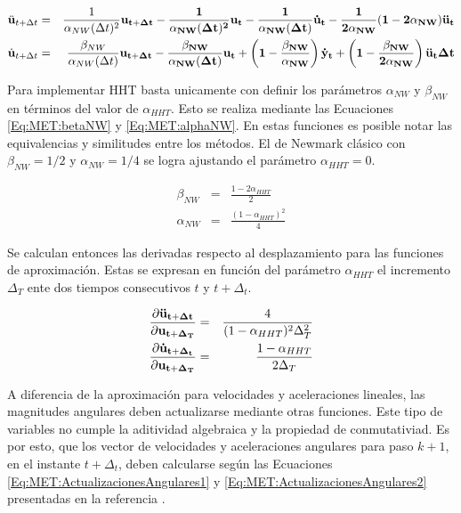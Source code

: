  \begin{eqnarray}
 \label{Eq:MET:AproxAceleracion}
 \ddot{\bf{u}}_{t+\Delta t}
 &=&
 \frac{1}{\alpha_{NW}(\Delta t)^2} \bf{u}_{t+\Delta t}
 - \frac{1}{\alpha_{NW} (\Delta t)^2} \bf{u}_{t} 
 - \frac{1}{\alpha_{NW} (\Delta t)  } \dot{\bf{u}}_{t} 
 - \frac{1}{2 \alpha_{NW}}  (1-2\alpha_{NW} ) \ddot{\bf{u}}_{t}   \\
 \label{Eq:MET:AproxVelcoity}
 \dot{\bf{u}}_{t+\Delta t}& =&
 \frac{\beta_{NW}}{\alpha_{NW} (\Delta t)} \bf{u}_{t+\Delta t}
 - \frac{\beta_{NW}}{\alpha_{NW} (\Delta t)} \bf{u}_{t}
 + \left( 1 - \frac{\beta_{NW}}{\alpha_{NW}} \right) \dot{\bf{y}}_{t}
 + \left( 1- \frac{\beta_{NW}}{2 \alpha_{NW}} \right) \ddot{\bf{u}}_{t} \Delta t
 \end{eqnarray}  

Para implementar HHT basta unicamente con definir los parámetros $\alpha_{NW}$ y $\beta_{NW}$ en términos del valor de $\alpha_{HHT}$. Esto se realiza mediante las Ecuaciones \eqref{Eq:MET:betaNW} y \eqref{Eq:MET:alphaNW}. En estas funciones es posible notar las equivalencias y similitudes entre los métodos. El de Newmark clásico con $\beta_{NW}=1/2$ y $\alpha_{NW} =1/4$ se logra ajustando el parámetro $\alpha_{HHT}=0$. 

\begin{eqnarray}
	\label{Eq:MET:betaNW}
 	\beta_{NW} &=& \frac{1-2\alpha_{HHT}}{2}\\
 	\label{Eq:MET:alphaNW}
 	\alpha_{NW} &=& \frac{(1-\alpha_{HHT})^2}{4}
\end{eqnarray}

Se calculan entonces las derivadas respecto al desplazamiento para las funciones de aproximación. Estas se expresan en función del parámetro $\alpha_{HHT}$ el incremento $\Delta_T$ ente dos tiempos consecutivos $t$ y $t+\Delta_t$.

\begin{eqnarray}
\label{Eq:Met:DerivadasAcelLinear}
\frac{\partial \bf{\ddot{u}_{t+\Delta t}}}{\partial \bf{{u}_{t+\Delta_T}}}& = &
\frac{4}{(1-\alpha_{HHT})^2 \Delta_T^2}\\
\label{Eq:Met:DerivadasVelLinear}
\frac{\partial \bf{\dot{u}_{t+\Delta_t}}}{\partial \bf{{u}_{t+\Delta_T}}}& = &
\frac{1-\alpha_{HHT}}{2\Delta_T}
\end{eqnarray}

A diferencia de la aproximación para velocidades y aceleraciones lineales, las magnitudes angulares deben actualizarse mediante otras funciones. Este tipo de variables no cumple la aditividad algebraica y la propiedad de conmutativiad. Es por esto, que los vector de velocidades y aceleraciones angulares para paso $k+1$, en el instante $t+\Delta_t$, deben calcularse según  las Ecuaciones \eqref{Eq:MET:ActualizacionesAngulares1} y \eqref{Eq:MET:ActualizacionesAngulares2} presentadas en la referencia \citep{ibrahimbegovic1998finite}. 


